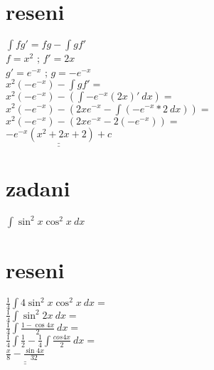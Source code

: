 \documentclass[a4paper]{article}
\def\doubleunderline#1{\underline{\underline{#1}}}
\begin{document}
\section*{reseni}
$\int fg' = fg - \int gf'$\\
\indent $f=x^2$ ; $f' = 2x$\\
\indent $g'=e^{-x}$ ; $g=-e^{-x}$\\
$x^2(-e^{-x})-\int gf'=$\\
$x^2(-e^{-x})-(\int -e^{-x} (2x)'~dx)=$\\
$x^2(-e^{-x})-(2x e^{-x} - \int (-e^{-x}*2~dx))=$\\
$x^2(-e^{-x})-(2x e^{-x} -2 (-e^{-x}))=$\\
$\doubleunderline{-e^{-x}(x^2+2x+2) + c}$\\











\section*{zadani}
$\int \sin^2 x \cos^2 x~dx$

\section*{reseni}
$\frac{1}{4} \int 4 \sin^2 x \cos^2 x~dx=$\\
$\frac{1}{4} \int \sin^2 2x~dx=$\\
$\frac{1}{4} \int \frac{1-\cos 4x}{2}~dx=$\\
$\frac{1}{4} \int \frac{1}{2} - \frac{1}{4} \int \frac{cos4x}{2}~dx=$\\
$\doubleunderline{\frac{x}{8} - \frac{\sin 4x}{32}}$\\
\end{document}
